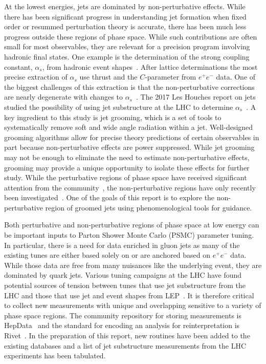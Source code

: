 \documentclass[11pt]{cernrep}
\begin{document}
At the lowest energies, jets are dominated by non-perturbative effects.  While there has been significant progress in understanding jet formation when fixed order or resummed perturbation theory is accurate, there has been much less progress outside these regions of phase space.  While such contributions are often small for most observables, they are relevant for a precision program involving hadronic final states.  One example is the determination of the strong coupling constant, $\alpha_s$, from hadronic event shapes~\cite{Abbate:2010xh,Hoang:2015hka,TheALEPHCollaboration2004,DELPHICollaboration1997,Abdallah:2004xe,Biebel:1999zt,Abbiendi:2004qz,Buskulic:1992hq}.   After lattice determinations the most precise extraction of $\alpha_s$ use thrust and the $C$-parameter from $e^+e^-$ data.  One of the biggest challenges of this extraction is that the non-perturbative corrections are nearly degenerate with changes to $\alpha_s$~\cite{Abbate:2010xh}.  The 2017 Les Houches report on jets studied the possibility of using jet substructure at the LHC to determine $\alpha_s$~\cite{Bendavid:2018nar}.  A key ingredient to this study is jet grooming, which is a set of tools to systematically remove soft and wide angle radiation within a jet.  Well-designed grooming algorithms allow for precise theory predictions of certain observables in part because non-perturbative effects are power suppressed.  While jet grooming may not be enough to eliminate the need to estimate non-perturbative effects, grooming may provide a unique opportunity to isolate these effects for further study.   While the perturbative regions of phase space have received significant attention from the community~\cite{Frye:2016aiz,Frye:2016okc,Marzani:2017mva,Marzani:2017kqd,Kang:2018vgn,Kang:2018jwa,Baron:2018nfz,Kardos:2018kth}, the non-perturbative regions have only recently been investigated~\cite{Hoang:2019ceu}.   One of the goals of this report is to explore the non-perturbative region of groomed jets using phenomenological tools for guidance. 

Both perturbative and non-perturbative regions of phase space at low energy can be important inputs to Parton Shower Monte Carlo (PSMC) parameter tuning.  In particular, there is a need for data enriched in gluon jets as many of the existing tunes are either based solely on or are anchored based on $e^+e^-$ data.  While those data are free from many nuisances like the underlying event, they are dominated by quark jets.  Various tuning campaigns at the LHC have found potential sources of tension between tunes that use jet substructure from the LHC and those that use jet and event shapes from LEP~\cite{ATL-PHYS-PUB-2014-021,Aad:2016oit}.  It is therefore critical to collect new measurements with unique and overlapping sensitive to a variety of phase space regions.  The community repository for storing measurements is HepData~\cite{Buckley:2010jn,Maguire:2017ypu} and the standard for encoding an analysis for reinterpretation is Rivet~\cite{Buckley:2010ar}.  In the preparation of this report, new routines have been added to the existing databases and a list of jet substructure measurements from the LHC experiments has been tabulated.
\end{document}
